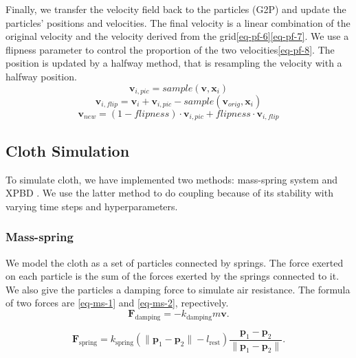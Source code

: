 Finally, we transfer the velocity field back to the particles (G2P) and update the particles' positions and velocities. The final velocity is a linear combination of the original velocity and the velocity derived from the grid\eqref{eq-pf-6}\eqref{eq-pf-7}. We use a flipness parameter to control the proportion of the two velocities\eqref{eq-pf-8}. The position is updated by a halfway method, that is resampling the velocity with a halfway position.
\begin{equation}
  \label{eq-pf-6}
  \mathbf{v}_{i,pic}=sample(\mathbf{v},\mathbf{x}_i)
\end{equation}
\begin{equation}
  \label{eq-pf-7}
  \mathbf{v}_{i,flip}=\mathbf{v}_i+\mathbf{v}_{i,pic}-sample(\mathbf{v}_{orig},\mathbf{x}_i)
\end{equation}
\begin{equation}
  \label{eq-pf-8}
  \mathbf{v}_{new}=(1-flipness)\cdot\mathbf{v}_{i,pic}+flipness\cdot\mathbf{v}_{i,flip}
\end{equation}

\subsection{Cloth Simulation}

To simulate cloth, we have implemented two methods: mass-spring system and XPBD \cite{10.1145/2994258.2994272}. We use the latter method to do coupling because of its stability with varying time steps and hyperparameters.

\subsubsection{Mass-spring}

We model the cloth as a set of particles connected by springs. The force exerted on each particle is the sum of the forces exerted by the springs connected to it. We also give the particles a damping force to simulate air resistance. The formula of two forces are \eqref{eq-ms-1} and \eqref{eq-ms-2}, repectively.
\begin{equation}
  \label{eq-ms-1}
\mathbf{F}_{\text{damping}}=-k_{\text{damping}}m\mathbf{v}.
\end{equation}

\begin{equation}
  \label{eq-ms-2}
\mathbf{F}_{\text{spring}}=k_{\text{spring}}(\|\mathbf{p}_1-\mathbf{p}_2\|-l_{\text{rest}})\frac{\mathbf{p}_1-\mathbf{p}_2}{\|\mathbf{p}_1-\mathbf{p}_2\|}.
\end{equation}

